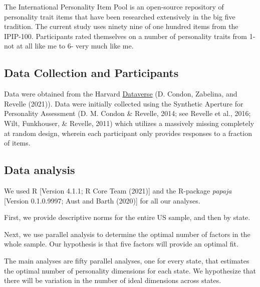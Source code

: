 \documentclass[
  english,
  man]{apa6}
\begin{document}
The International Personality Item Pool is an open-source repository of personality trait items that have been researched extensively in the big five tradition. The current study uses ninety nine of one hundred items from the IPIP-100. Participants rated themselves on a number of personality traits from 1- not at all like me to 6- very much like me.

\hypertarget{data-collection-and-participants}{%
\subsection{Data Collection and Participants}\label{data-collection-and-participants}}

Data were obtained from the Harvard \href{https://dataverse.harvard.edu/dataverse/SAPA-Project}{Dataverse} (D. Condon, Zabelina, and Revelle (2021)). Data were initially collected using the Synthetic Aperture for Personality Assessment (D. M. Condon \& Revelle, 2014; see Revelle et al., 2016; Wilt, Funkhouser, \& Revelle, 2011) which utilizes a massively missing completely at random design, wherein each participant only provides responses to a fraction of items.

\hypertarget{data-analysis}{%
\subsection{Data analysis}\label{data-analysis}}

We used R {[}Version 4.1.1; R Core Team (2021){]} and the R-package \emph{papaja} {[}Version 0.1.0.9997; Aust and Barth (2020){]} for all our analyses.

First, we provide descriptive norms for the entire US sample, and then by state.

Next, we use parallel analysis to determine the optimal number of factors in the whole sample. Our hypothesis is that five factors will provide an optimal fit.

The main analyses are fifty parallel analyses, one for every state, that estimates the optimal number of personality dimensions for each state. We hypothesize that there will be variation in the number of ideal dimensions across states.
\end{document}
